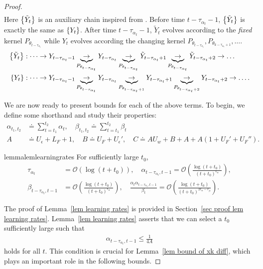 \documentclass[twoside,11pt]{article}
\newcommand{\fO}{\mathcal{O}}
\numberwithin{assucounter}{section}
\begin{document}
\begin{proof}
\begin{align}
\end{align}
Here $\qty{\tilde Y_t}$ is an auxiliary chain inspired from \citet{zou2019finite}.
Before time $t - \tau_{\alpha_t} - 1$,
$\qty{\tilde Y_t}$ is exactly the same as $\qty{Y_t}$.
After time $t - \tau_{\alpha_t} - 1$,
$\tilde Y_t$ evolves according to the \emph{fixed} kernel $P_{\theta_{t-\tau_{\alpha_t}}}$
while $Y_t$ evolves according the changing kernel $P_{\theta_{t - \tau_{\alpha_t}}}, P_{\theta_{k - \tau_{\alpha_t} + 1}}, \dots$.
\begin{align}
  \qty{\tilde Y_t}&: \dots \to Y_{t-\tau_{\alpha_t}-1} \underbrace{\to}_{P_{\theta_{t-\tau_{\alpha_t}}}} Y_{t-\tau_{\alpha_t}} \underbrace{\to}_{P_{\theta_{t-\tau_{\alpha_t}}}} \tilde Y_{t-\tau_{\alpha_t}+1} \underbrace{\to}_{P_{\theta_{t-\tau_{\alpha_t}}}} \tilde Y_{t-\tau_{\alpha_t}+2} \to \dots \\
  \qty{Y_t}&: \dots \to Y_{t-\tau_{\alpha_t}-1} \underbrace{\to}_{P_{\theta_{t-\tau_{\alpha_t}}}} Y_{t-\tau_{\alpha_t}} \underbrace{\to}_{P_{\theta_{t-\tau_{\alpha_t}+1}}} Y_{t-\tau_{\alpha_t}+1} \underbrace{\to}_{P_{\theta_{t-\tau_{\alpha_t}+2}}} Y_{t-\tau_{\alpha_t}+2} \to \dots.
\end{align}

We are now ready to present bounds for each of the above terms.
To begin,
we define some shorthand and study their properties:
\begin{align}
  \alpha_{t_1, t_2} &\doteq \sum_{t=t_1}^{t_2} \alpha_t, \quad \beta_{t_1, t_2} \doteq \sum_{t=t_1}^{t_2} \beta_t  \\
  \label{eq shorthand a and b}
  A &\doteq U_\epsilon + L_F + 1, \quad B \doteq U_F + U_\epsilon', \quad C \doteq AU_w + B + A + A(1 + U_F' + U_F'').
\end{align}
\begin{restatable}{lemma}{lemlearningrates}
  \label{lem learning rates}
  For sufficiently large $t_0$,
  \begin{align}
    \tau_{\alpha_t} &= \fO(\log (t+t_0)), \quad \alpha_{t-\tau_{\alpha_t}, t-1} = \fO\left(\frac{\log (t+t_0)}{(t+t_0)^{\epsilon_\alpha}}\right), \\
    \beta_{t-\tau_{\alpha_t}, t-1} &= \fO\left(\frac{\log (t+t_0)}{(t+t_0)^{\epsilon_\alpha}}\right), \quad \frac{\alpha_t \alpha_{t-\tau_{\alpha_t}, t-1}}{\beta_t} = \fO\left(\frac{\log (t+t_0)}{(t+t_0)^{2\epsilon_\alpha - \epsilon_\beta}}\right).
  \end{align}
\end{restatable}
\noindent
The proof of Lemma~\ref{lem learning rates} is provided in Section~\ref{sec proof lem learning rates}.
Lemma~\ref{lem learning rates} asserts that we can select a $t_0$ sufficiently large such that
\begin{align}
  \alpha_{t-\tau_{\alpha_t}, t-1} \leq \frac{1}{4A}
\end{align}
holds for all $t$.
This condition is crucial for Lemma~\ref{lem bound of xk diff},
which plays an important role in the following bounds.


\end{proof}
\end{document}
